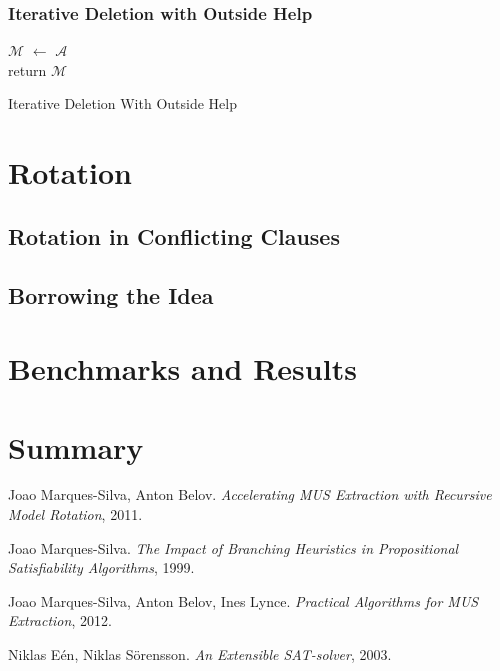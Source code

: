 \documentclass[]{article}
\begin{document}
		\subsubsection{Iterative Deletion with Outside Help}
			\begin{algorithm}[H]
				$ \mathcal{M} $ $\leftarrow$ $ \mathcal{A} $\\
				return $ \mathcal{M} $
				\caption{Iterative Deletion With Outside Help}
			\end{algorithm}
	
	\section{Rotation}
	\subsection{Rotation in Conflicting Clauses}
	\subsection{Borrowing the Idea}
	
	\section{Benchmarks and Results}
	
	\section{Summary}
	
	\pagebreak
	\begin{thebibliography}{9}
		
			Joao Marques-Silva,
			Anton Belov.
			\textit{Accelerating MUS Extraction with Recursive Model Rotation},
			2011.
			
			Joao Marques-Silva.
			\textit{The Impact of Branching Heuristics in Propositional Satisfiability Algorithms},
			1999.
			
			Joao Marques-Silva,
			 Anton Belov,
			 Ines Lynce.
			\textit{Practical Algorithms for MUS Extraction},
			2012.
			
			Niklas Eén,
			Niklas Sörensson.
			\textit{An Extensible SAT-solver},
			2003.
			
		
		
	\end{thebibliography}
\end{document}
